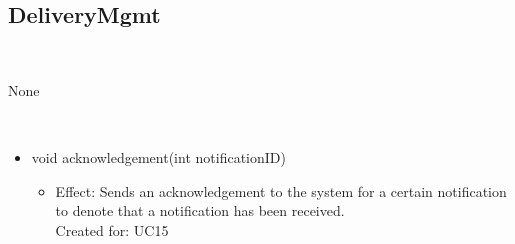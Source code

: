   \subsection{DeliveryMgmt}\label{int:OnlineServiceNotificationHandlerDeliveryMgmt}
    \begin{description}
      \item[Provided by:] \iconcomponent{}~
      \item[Required by:] None
      \item[Operations:] ~
    \begin{itemize}[noitemsep,nolistsep,leftmargin=-.25cm]
      \item \textsf{void acknowledgement(int notificationID)}
        \begin{itemize}[noitemsep,nolistsep]
           \item Effect: Sends an acknowledgement to the system for a certain notification to denote that a notification has been received. \\
Created for: UC15
        \end{itemize}
    \end{itemize}
    \end{description}

